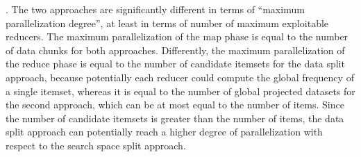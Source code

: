 . 
The two approaches are significantly different in terms of ``maximum parallelization degree'', at least in terms of number of maximum exploitable reducers. 
The maximum parallelization of the map phase is equal to the number of data chunks for both approaches.
Differently, the maximum parallelization of the reduce phase is equal to the number of candidate itemsets for the data split approach, because potentially each reducer could compute the global frequency of a single itemset, whereas it is equal to the number of global projected datasets for the second approach, which can be at most equal to the number of items. 
Since the number of candidate itemsets is greater than the number of items, the data split approach can potentially reach a higher degree of parallelization with respect to the search space split approach. 


